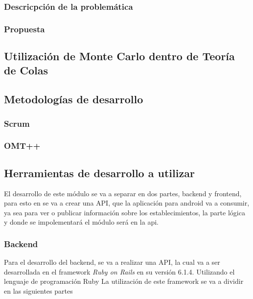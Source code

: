 \subsubsection{Descricpción de la problemática}
\subsubsection{Propuesta}

\subsection{Utilización de Monte Carlo dentro de Teoría de Colas}

\subsection{Metodologías de desarrollo}
\subsubsection{Scrum}


\subsubsection{OMT++}

\subsection{Herramientas de desarrollo a utilizar}

El desarrollo de este módulo se va a separar en dos partes, backend y frontend, para esto en se va a crear una API, que la aplicación para android va a consumir, ya sea para ver o publicar información sobre los establecimientos, la parte lógica y donde se impolementará el módulo será en la api.

\subsubsection{Backend}
Para el desarrollo del backend, se va a realizar una API, la cual va a ser desarrollada en el framework
\textit{Ruby on Rails} en su versión 6.1.4. Utilizando el lenguaje de programación Ruby
\newline\newline
La utilización de este framework se va a dividir en las siguientes partes

